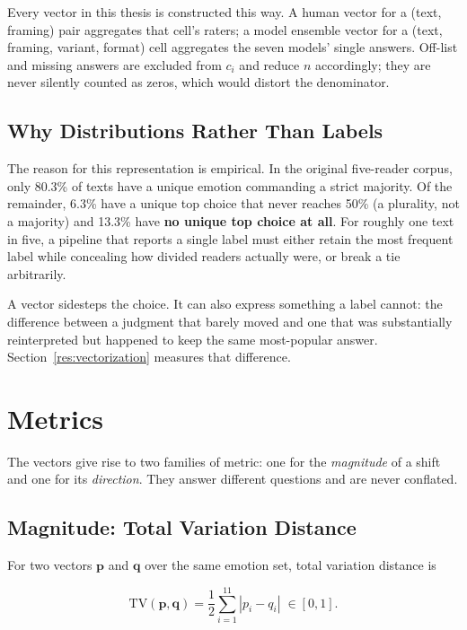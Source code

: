 \noindent
Every vector in this thesis is constructed this way. A human vector for a (text, framing) pair
aggregates that cell's raters; a model ensemble vector for a (text, framing, variant, format) cell aggregates the seven models' single answers. Off-list and
missing answers are excluded from $c_i$ and reduce $n$ accordingly; they are never silently
counted as zeros, which would distort the denominator.

\subsection{Why Distributions Rather Than Labels}
\label{impl:whyvectors}

\noindent
The reason for this representation is empirical. In the original five-reader corpus, only 80.3\%
of texts have a unique emotion commanding a strict majority. Of the remainder, 6.3\% have a
unique top choice that never reaches 50\% (a plurality, not a majority) and 13.3\% have
\textbf{no unique top choice at all}. For roughly one text in five, a pipeline that reports a
single label must either retain the most frequent label while concealing how divided readers
actually were, or break a tie arbitrarily.

A vector sidesteps the choice. It can also express something a label cannot: the difference
between a judgment that barely moved and one that was substantially reinterpreted but happened to
keep the same most-popular answer. Section~\ref{res:vectorization} measures that difference.

\section{Metrics}
\label{impl:metrics}

\noindent
The vectors give rise to two families of metric: one for the \emph{magnitude} of a shift and one
for its \emph{direction}. They answer different questions and are never conflated.

\subsection{Magnitude: Total Variation Distance}
\label{impl:tv}

\noindent
For two vectors $\mathbf{p}$ and $\mathbf{q}$ over the same emotion set, total variation distance
is

\begin{equation}
\mathrm{TV}(\mathbf{p}, \mathbf{q}) = \frac{1}{2}\sum_{i=1}^{11} |p_i - q_i| \; \in [0, 1].
\end{equation}

